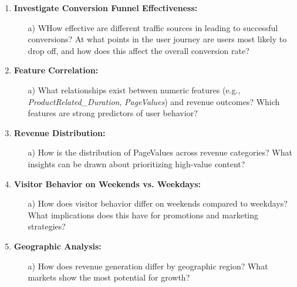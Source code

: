 \documentclass[12pt]{article}
\begin{document}
\begin{enumerate}
\begin{enumerate}
    \end{enumerate}


    \item \textbf{Investigate Conversion Funnel Effectiveness:}
    
    \begin{enumerate}
        \item[a)] WHow effective are different traffic sources in leading to successful conversions? At what points in the user journey are users most likely to drop off, and how does this affect the overall conversion rate?

    \end{enumerate}

    \item \textbf{Feature Correlation:}
    
    \begin{enumerate}
    \item[a)] What relationships exist between numeric features (e.g., \textit{ProductRelated\_Duration}, \textit{PageValues}) and revenue outcomes? Which features are strong predictors of user behavior?
    \end{enumerate}


    \item \textbf{Revenue Distribution:}
    
    \begin{enumerate}
        \item[a)] How is the distribution of PageValues across revenue categories? What insights can be drawn about prioritizing high-value content?
    \end{enumerate}

    \item \textbf{Visitor Behavior on Weekends vs. Weekdays:}
    
    \begin{enumerate}
        \item[a)] How does visitor behavior differ on weekends compared to weekdays? What implications does this have for promotions and marketing strategies?
    \end{enumerate}

    \item \textbf{Geographic Analysis:}
    
    \begin{enumerate}
        \item[a)] How does revenue generation differ by geographic region? What markets show the most potential for growth?
    \end{enumerate}


\end{enumerate}
\end{document}
